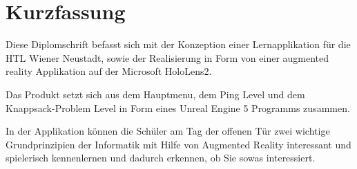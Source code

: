 \chapter{Kurzfassung}

Diese Diplomschrift befasst sich mit der Konzeption einer Lernapplikation
für die HTL Wiener Neustadt, sowie der Realisierung in Form von 
einer augmented reality Applikation auf der Microsoft HoloLens2.

Das Produkt setzt sich aus dem Hauptmenu, dem Ping Level und dem
Knappsack-Problem Level in Form eines Unreal Engine 5 Programms zusammen.

In der Applikation können die Schüler am Tag der offenen Tür zwei wichtige
Grundprinzipien der Informatik mit Hilfe von Augmented Reality interessant und
spielerisch kennenlernen und dadurch erkennen, ob Sie sowas interessiert.
